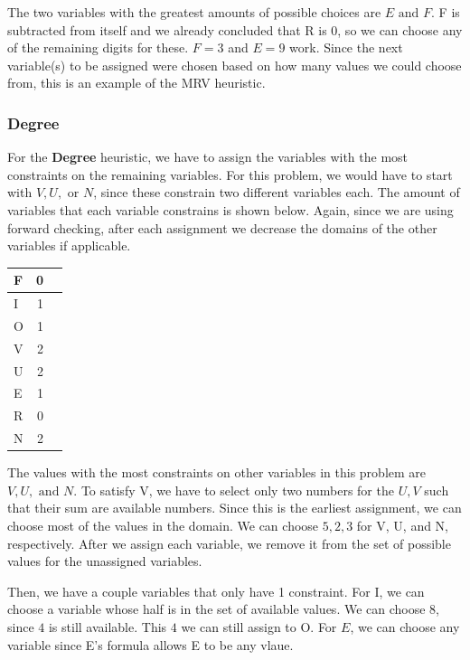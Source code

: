 \documentclass{article}
\begin{document}
			The two variables with the greatest amounts of possible choices are $E \textrm{ and } F$. F is
			subtracted from itself and we already concluded that R is 0, so we can choose any of the remaining
			digits for these. $F = 3$ and $E = 9$ work. Since the next variable(s) to be assigned were chosen
			based on how many values we could choose from, this is an example of the MRV heuristic.
		\subsubsection{Degree}
			For the \textbf{Degree} heuristic, we have to assign the variables with the most constraints on the
			remaining variables. For this problem, we would have to start with $V, U, \textrm{ or }N$, since these
			constrain two different variables each. The amount of variables that each variable constrains
			is shown below. Again, since we are using forward checking, after each assignment we decrease the 
			domains of the other variables if applicable.
			\begin{center}
				\begin{tabular}{| l | r | c}
				\hline
				F & 0\\\hline 
				I & 1\\\hline
				O & 1\\\hline
				V & 2\\\hline
				U & 2\\\hline
				E & 1\\\hline
				R & 0\\\hline
				N & 2\\\hline
				\end{tabular}
			\end{center}
			The values with the most constraints on other variables in this problem are $V, U, \textrm{ and }N$.
			To satisfy V, we have to select only two numbers for the $U,V$ such that their sum are available 
			numbers. Since this is the earliest assignment, we can choose most of the values in the domain. We 
			can choose $5, 2, 3$ for V, U, and N, respectively. After we assign each variable, we remove it from
			the set of possible values for the unassigned variables.

			Then, we have a couple variables that only have 1 constraint. For I, we can choose a variable whose
			half is in the set of available values. We can choose $8$, since $4$ is still available. This $4$
			we can still assign to O. For $E$, we can choose any variable since E's formula allows E to be any 
			vlaue.
\end{document}
